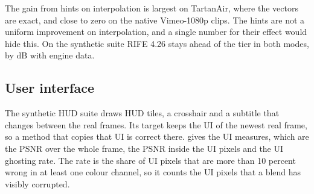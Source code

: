 \Observation{} The gain from hints on interpolation is largest on TartanAir, where the vectors are exact, and close to zero on the native Vimeo-1080p clips. The hints are not a uniform improvement on interpolation, and a single number for their effect would hide this. On the synthetic suite RIFE 4.26 stays ahead of the  tier in both modes, by  dB with engine data.

\subsection{User interface}\label{sec:fgr-ui}

The synthetic HUD suite draws HUD tiles, a crosshair and a subtitle that changes between the real frames. Its target keeps the UI of the newest real frame, so a method that copies that UI is correct there.  gives the UI measures, which are the PSNR over the whole frame, the PSNR inside the UI pixels and the UI ghosting rate. The rate is the share of UI pixels that are more than 10 percent wrong in at least one colour channel, so it counts the UI pixels that a blend has visibly corrupted.

